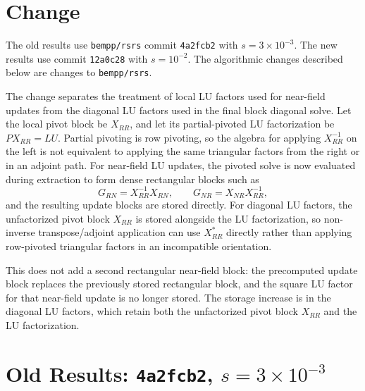 \documentclass[11pt]{article}
\begin{document}
\section*{Change}

The old results use \texttt{bempp/rsrs} commit \texttt{4a2fcb2} with
$s=3{\times}10^{-3}$. The new results use commit \texttt{12a0c28} with
$s=10^{-2}$. The algorithmic changes described below are changes to
\texttt{bempp/rsrs}.

The change separates the treatment of local LU factors used for near-field
updates from the diagonal LU factors used in the final block diagonal solve.
Let the local pivot block be $X_{RR}$, and let its partial-pivoted LU factorization be
$P X_{RR} = L U$. Partial pivoting is row pivoting, so the algebra for applying
$X_{RR}^{-1}$ on the left is not equivalent to applying the same triangular
factors from the right or in an adjoint path. For near-field LU updates, the
pivoted solve is now evaluated during extraction to form dense rectangular
blocks such as
\[
    G_{RN} = X_{RR}^{-1} X_{RN}, \qquad
    G_{NR} = X_{NR} X_{RR}^{-1},
\]
and the resulting update blocks are stored directly. For diagonal LU factors,
the unfactorized pivot block $X_{RR}$ is stored alongside the LU factorization,
so non-inverse transpose/adjoint application can use $X_{RR}^*$ directly rather
than applying row-pivoted triangular factors in an incompatible orientation.

This does not add a second rectangular near-field block: the precomputed update
block replaces the previously stored rectangular block, and the square LU factor
for that near-field update is no longer stored. The storage increase is in the
diagonal LU factors, which retain both the unfactorized pivot block $X_{RR}$ and
the LU factorization.

\section*{Old Results: \texttt{4a2fcb2}, $s=3{\times}10^{-3}$}
\end{document}
